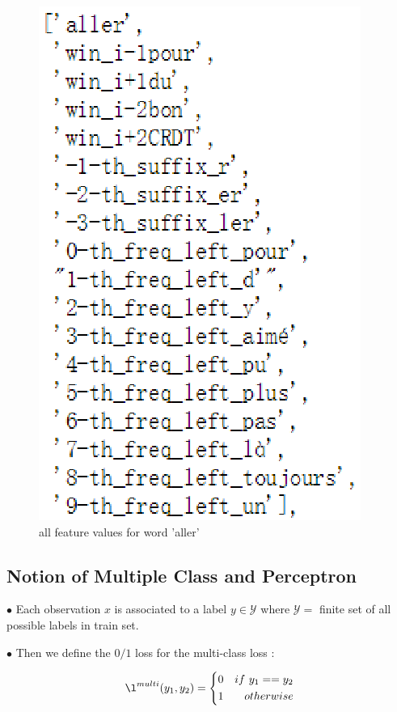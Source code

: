\documentclass{article}
\def\YY{{\mathcal{Y}}}
\begin{document}
\begin{figure}[ht]
\centering
\includegraphics[scale=1]{featurealler.eps}
\caption{all feature values for word 'aller'}
\label{figure1}
\end{figure}

\subsection{Notion of Multiple Class and Perceptron}
$\bullet$ Each observation $x$ is associated to a label $y \in \YY$ where $\YY = $ finite set of all possible labels in train set. 

$\bullet$ Then we define the $0/1$ loss for the multi-class loss : 

\begin{equation}
\l^{multi}(y_1, y_2) = \left\{
\begin{aligned}
0 & & if\ y_1 == y_2\\
1 & &otherwise
\end{aligned}
\right.
\end{equation}
\end{document}
